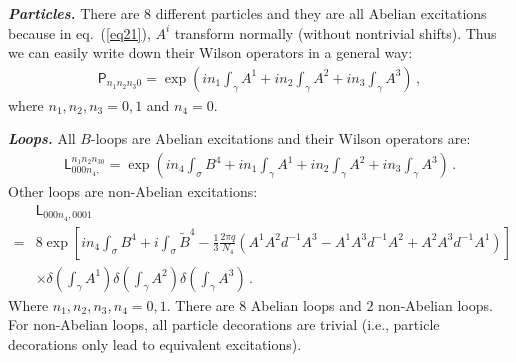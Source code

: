 \documentclass[11pt,nofootinbib,preprint]{revtex4-1}
\begin{document}
\textbf{\textit{Particles.}}
There are $8$ different particles and  they are all Abelian excitations because in eq.~(\ref{eq21}), $A^i$ transform normally (without nontrivial shifts). Thus we can easily write down their Wilson operators in a general way:
\begin{align}
	\mathsf{P}_{n_{1}n_{2}n_{3}0}=\exp \left( in_{1}\int_{\gamma}{A^1}+in_{2}\int_{\gamma}{A^2}+in_{3}\int_{\gamma}{A^3} \right)\,,
	\label{AAABparticle}
\end{align}
where $n_{1},n_{2},n_{3}=0,1$ and $n_{4}=0$.

\textbf{\textit{Loops.}}
All $B$-loops are Abelian excitations and their Wilson operators are:
\begin{align}
	\mathsf{L}_{000n_4,}^{n_1n_2n_30}=\exp \left( in_4\int_{\sigma}{B^4}+in_1\int_{\gamma}{A^1}+in_2\int_{\gamma}{A^2}+in_3\int_{\gamma}{A^3} \right) \,.
	\label{AAABloop1}
\end{align}
Other loops are non-Abelian excitations:
\begin{align}
	&\mathsf{L}_{000n_4,0001}\nonumber
	\\
	=&8\exp \left[ in_4\int_{\sigma}{B^4}+i\int_{\sigma}{\tilde{B}^4}-\frac{1}{3}\frac{2\pi q}{N_4}\left( A^1A^2d^{-1}A^3-A^1A^3d^{-1}A^2+A^2A^3d^{-1}A^1 \right) \right] \nonumber 
	\\
	&\times \delta \left( \int_{\gamma}{A^1} \right) \delta \left( \int_{\gamma}{A^2} \right) \delta \left( \int_{\gamma}{A^3} \right) \,.
	\label{AAABloop2}
\end{align}
Where $n_{1},n_{2},n_{3},n_{4}=0,1$. There are $8$ Abelian loops and $2$ non-Abelian loops. For non-Abelian loops, all particle decorations are trivial (i.e., particle decorations only lead to equivalent excitations).
\end{document}
